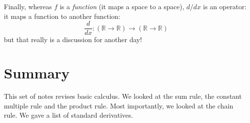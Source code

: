 \documentclass[12pt]{article}
\begin{document}
Finally, whereas $f$ is a \emph{function} (it maps a space to a space), $d/dx$ is an operator: it maps a function to another function:
\begin{equation}
  \frac{d}{dx}:(\mathbb{R}\rightarrow\mathbb{R})\rightarrow(\mathbb{R}\rightarrow\mathbb{R})
\end{equation}
but that really is a discussion for another day!



\section*{Summary}

This set of notes revises basic calculus. We looked at the sum rule, the constant multiple rule and the product rule. Most importantly, we looked at the chain rule. We gave a list of standard derivatives.
\end{document}

